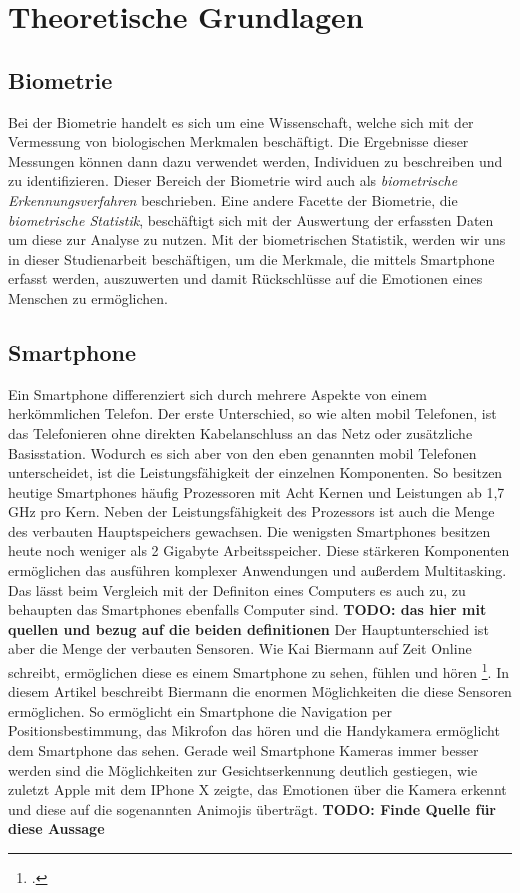 \section{Theoretische Grundlagen}
\subsection{Biometrie}
Bei der Biometrie handelt es sich um eine Wissenschaft, welche sich mit der Vermessung von biologischen Merkmalen beschäftigt.\newline
Die Ergebnisse dieser Messungen können dann dazu verwendet werden, Individuen zu beschreiben und zu identifizieren. Dieser Bereich 
der Biometrie wird auch als \textit{biometrische Erkennungsverfahren} beschrieben. Eine andere Facette der Biometrie, die \textit{biometrische Statistik},
beschäftigt sich mit der Auswertung der erfassten Daten um diese zur Analyse zu nutzen.\newline
Mit der biometrischen Statistik, werden wir uns in dieser Studienarbeit beschäftigen, um die Merkmale, die mittels 
Smartphone erfasst werden, auszuwerten und damit Rückschlüsse auf die Emotionen eines Menschen zu ermöglichen.
\subsection{Smartphone}
Ein Smartphone differenziert sich durch mehrere Aspekte von einem herkömmlichen Telefon. Der erste Unterschied, so wie alten mobil Telefonen, ist das Telefonieren ohne direkten Kabelanschluss an das Netz oder zusätzliche Basisstation.\newline 
Wodurch es sich aber von den eben genannten mobil Telefonen unterscheidet, ist die Leistungsfähigkeit der einzelnen Komponenten. So besitzen heutige Smartphones häufig Prozessoren mit Acht Kernen und Leistungen ab 1,7 GHz pro Kern. Neben der Leistungsfähigkeit des Prozessors ist auch die Menge des verbauten Hauptspeichers gewachsen. Die wenigsten Smartphones besitzen heute noch weniger als 2 Gigabyte Arbeitsspeicher. Diese stärkeren Komponenten ermöglichen das ausführen komplexer Anwendungen und außerdem Multitasking. Das lässt beim Vergleich mit der Definiton eines Computers es auch zu, zu behaupten das Smartphones ebenfalls Computer sind. \textbf{TODO: das hier mit quellen und bezug auf die beiden definitionen}\newline
Der Hauptunterschied ist aber die Menge der verbauten Sensoren. Wie Kai Biermann auf Zeit Online schreibt, ermöglichen diese es einem Smartphone zu sehen, fühlen und hören \footcite[Vgl.][S. 1 Abs. 2]{Bie14}. In diesem Artikel beschreibt Biermann die enormen Möglichkeiten die diese Sensoren ermöglichen. So ermöglicht ein Smartphone die Navigation per Positionsbestimmung, das Mikrofon das hören und die Handykamera ermöglicht dem Smartphone das sehen. Gerade weil Smartphone Kameras immer besser werden sind die Möglichkeiten zur Gesichtserkennung deutlich gestiegen, wie zuletzt Apple mit dem IPhone X zeigte, das Emotionen über die Kamera erkennt und diese auf die sogenannten Animojis überträgt. \textbf{TODO: Finde Quelle für diese Aussage} 

